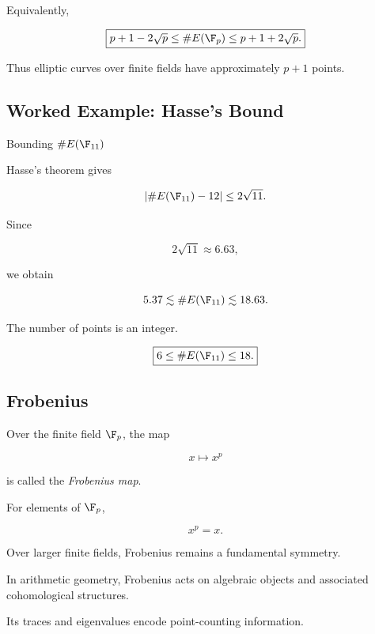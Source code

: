 Equivalently,

\[ \boxed{p+1-2\sqrt p\leq\#E(\F_p)\leq p+1+2\sqrt p.} \]

Thus elliptic curves over finite fields have approximately \(p+1\) points.

\subsection{Worked Example: Hasse's Bound}
\label{subsec:worked-hasse-bound}

\begin{workedexamplebox}{Bounding \(\#E(\F_{11})\)}

Hasse's theorem gives

\[ |\#E(\F_{11})-12|\leq2\sqrt{11}. \]

Since

\[ 2\sqrt{11}\approx6.63, \]

we obtain

\[ 5.37\lesssim\#E(\F_{11})\lesssim18.63. \]

The number of points is an integer.

\begin{answerbox}
\[ \boxed{6\leq\#E(\F_{11})\leq18.} \]
\end{answerbox}
\end{workedexamplebox}

\subsection{Frobenius}
\label{subsec:frobenius-arithmetic-geometry}

Over the finite field \(\F_p\), the map

\[ x\longmapsto x^p \]

is called the \emph{Frobenius map}.

For elements of \(\F_p\),

\[ x^p=x. \]

Over larger finite fields, Frobenius remains a fundamental symmetry.

In arithmetic geometry, Frobenius acts on algebraic objects and associated
cohomological structures.

Its traces and eigenvalues encode point-counting information.

